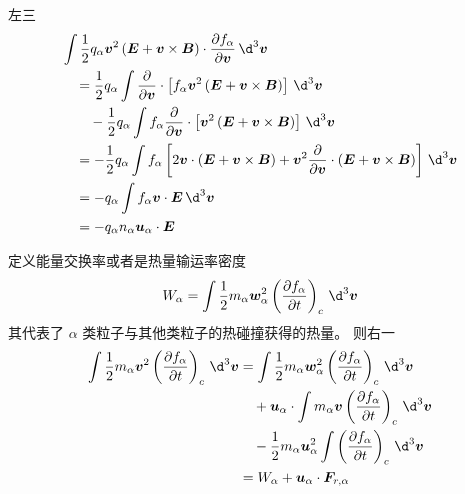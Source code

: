 左三
\begin{equation}\begin{aligned}
&\int \frac{1}{2} q_\alpha \vector{v}^2 \left( \vector{E} + \vector{v} \times \vector{B} \right) \cdot \pDeriv{f_\alpha}{\vector{v}} \, \d^3 \vector{v} \\
& \quad = \frac{1}{2} q_\alpha \int \pDeriv{}{\vector{v}} \cdot \left[
    f_\alpha \vector{v}^2 \left( \vector{E} + \vector{v} \times \vector{B} \right)
\right] \, \d^3 \vector{v} \\
&  \quad\quad - \frac{1}{2} q_\alpha \int f_\alpha \pDeriv{}{\vector{v}} \cdot \left[
    \vector{v}^2 \left( \vector{E} + \vector{v} \times \vector{B} \right)
\right] \, \d^3 \vector{v} \\
& \quad = - \frac{1}{2} q_\alpha \int f_\alpha \left[
    2 \vector{v} \cdot \left( \vector{E} + \vector{v} \times \vector{B} \right)
    + \vector{v}^2 \pDeriv{}{\vector{v}} \cdot \left( \vector{E} + \vector{v} \times \vector{B} \right)
\right] \, \d^3 \vector{v} \\
& \quad = - q_\alpha \int f_\alpha \vector{v} \cdot \vector{E} \, \d^3 \vector{v} \\
& \quad = - q_\alpha n_\alpha \vector{u}_\alpha \cdot \vector{E}
\end{aligned}\end{equation}

定义能量交换率或者是热量输运率密度
\begin{equation}
W_\alpha = \int \frac{1}{2} m_\alpha \vector{w}_\alpha^2 \left( \pDeriv{f_\alpha}{t} \right)_c \, \d^3 \vector{v}
\end{equation}
其代表了 $\alpha$ 类粒子与其他类粒子的热碰撞获得的热量。
则右一
\begin{equation}\begin{aligned}
\int \frac{1}{2} m_\alpha \vector{v}^2 \left( \pDeriv{f_\alpha}{t} \right)_c \, \d^3 \vector{v}
&= \int \frac{1}{2} m_\alpha \vector{w}_\alpha^2 \left( \pDeriv{f_\alpha}{t} \right)_c \, \d^3 \vector{v} \\
& \quad + \vector{u}_\alpha \cdot \int m_\alpha \vector{v} \left( \pDeriv{f_\alpha}{t} \right)_c \, \d^3 \vector{v} \\
& \quad - \frac{1}{2} m_\alpha \vector{u}_\alpha^2 \int \left( \pDeriv{f_\alpha}{t} \right)_c \, \d^3 \vector{v} \\
&= W_\alpha + \vector{u}_\alpha \cdot \vector{F}_{r,\alpha}
\end{aligned}\end{equation}

